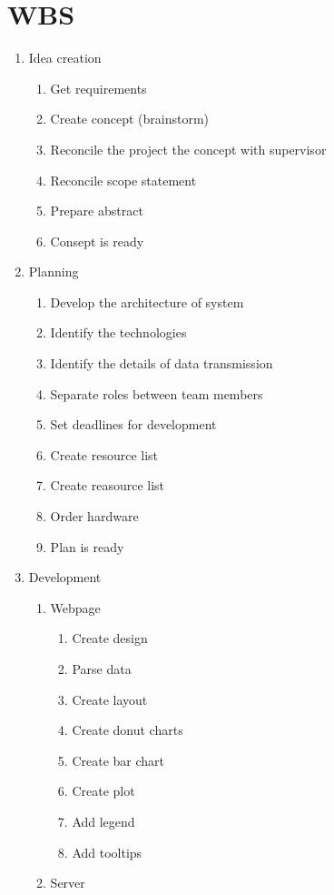 \documentclass[english]{article}
\begin{document}
\section{WBS}
\begin{enumerate}
\item Idea creation
	\begin{enumerate}[label*=\arabic*]
	\item Get requirements
	\item Create concept (brainstorm)
	\item Reconcile the project the concept with supervisor
	\item Reconcile scope statement
	\item Prepare abstract
	\item Consept is ready
	\end{enumerate}
\item Planning
	\begin{enumerate}[label*=\arabic*]
	\item Develop the architecture of system
	\item Identify the technologies
	\item Identify the details of data transmission
	\item Separate roles between team members
	\item Set deadlines for development
	\item Create resource list
	\item Create reasource list
	\item Order hardware
	\item Plan is ready
	\end{enumerate}
\item Development 
	\begin{enumerate}[label*=\arabic*]
	\item Webpage
		\begin{enumerate}[label*=\arabic*]
		\item Create design
		\item Parse data
		\item Create layout
		\item Create donut charts
		\item Create bar chart
		\item Create plot
		\item Add legend
		\item Add tooltips
		\end{enumerate}
	\item Server
		\begin{enumerate}[label*=\arabic*]

\end{enumerate}
\end{enumerate}
\end{enumerate}
\end{document}
